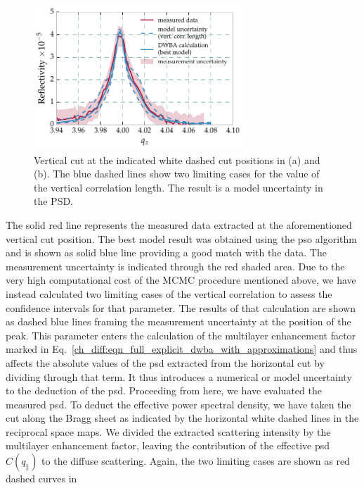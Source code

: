 \begin{figure}[htbp]
  \centering
  \includegraphics[width=0.7\textwidth]{img/CrSc_diffuse_vertical_correlation}
  \caption{ Vertical cut at the indicated white dashed cut 
positions in (a) and (b). The blue dashed lines show two limiting cases for the 
value of the vertical correlation length. The result is a model uncertainty in 
the PSD.}
  \label{ch_diff:fig_CrSc_diffuse_vertical_correlation}
\end{figure}
The solid red line represents the measured data extracted at the aforementioned vertical cut position. The best model result was obtained using the \gls{pso} algorithm and is shown as solid blue line providing a good match with the data. The measurement uncertainty is indicated through the red shaded area. Due to the very high computational cost of the MCMC procedure mentioned above, we have instead
calculated two limiting cases of the vertical correlation to assess the confidence intervals for that parameter. The results of that calculation are shown as dashed blue lines framing the measurement uncertainty at the position of the peak. This parameter enters the calculation of the multilayer enhancement factor marked in Eq.~\eqref{ch_diff:eqn_full_explicit_dwba_with_approximations} and thus affects the absolute values of the \gls{psd} extracted from the horizontal cut by dividing through that term. It thus introduces a numerical or model uncertainty to the deduction of the \gls{psd}. Proceeding from here, we have evaluated the measured 
\gls{psd}. To deduct the effective power spectral density, we have taken the cut along the Bragg sheet as indicated by the horizontal white dashed lines in the reciprocal space 
maps. We divided the extracted scattering intensity by the multilayer 
enhancement factor, leaving the contribution of the effective \gls{psd} $C(q_\parallel)$ to the diffuse scattering. Again, the two limiting cases are shown as red dashed curves in 
